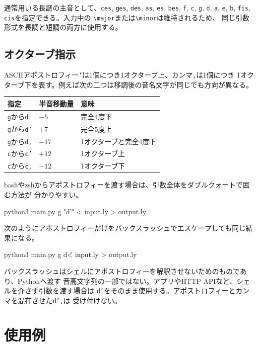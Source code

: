 \documentclass[uplatex,a4paper,11pt]{jsbook}
\begin{document}
通常用いる長調の主音として、\texttt{ces}, \texttt{ges}, \texttt{des}, \texttt{as},
\texttt{es}, \texttt{bes}, \texttt{f}, \texttt{c}, \texttt{g}, \texttt{d}, \texttt{a},
\texttt{e}, \texttt{b}, \texttt{fis}, \texttt{cis}を指定できる。入力中の
\texttt{\textbackslash major}または\texttt{\textbackslash minor}は維持されるため、
同じ引数形式を長調と短調の両方に使用する。

\section{オクターブ指示}

ASCIIアポストロフィー\texttt{'}は1個につき1オクターブ上、カンマ\texttt{,}は1個につき
1オクターブ下を表す。例えば次の二つは移調後の音名文字が同じでも方向が異なる。

\begin{longtable}{@{}lll@{}}
\toprule
指定 & 半音移動量 & 意味\\
\midrule
\texttt{g}から\texttt{d} & \(-5\) & 完全4度下\\
\texttt{g}から\texttt{d'} & \(+7\) & 完全5度上\\
\texttt{g}から\texttt{d,} & \(-17\) & 1オクターブと完全4度下\\
\texttt{c}から\texttt{c'} & \(+12\) & 1オクターブ上\\
\texttt{c}から\texttt{c,} & \(-12\) & 1オクターブ下\\
\bottomrule
\end{longtable}

bashやzshからアポストロフィーを渡す場合は、引数全体をダブルクォートで囲む方法が
分かりやすい。

\begin{command}
python3 main.py g "d'" < input.ly > output.ly
\end{command}

次のようにアポストロフィーだけをバックスラッシュでエスケープしても同じ結果になる。

\begin{command}
python3 main.py g d\' < input.ly > output.ly
\end{command}

バックスラッシュはシェルにアポストロフィーを解釈させないためのものであり、Pythonへ渡す
音高文字列の一部ではない。アプリやHTTP APIなど、シェルを介さず引数を渡す場合は
\texttt{d'}をそのまま使用する。アポストロフィーとカンマを混在させた\texttt{d',}は
受け付けない。

\chapter{使用例}
\end{document}
